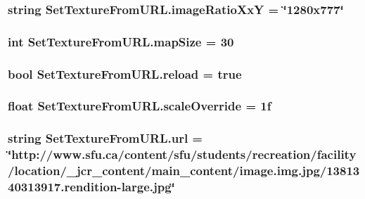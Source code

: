 \subsubsection[{\texorpdfstring{image\+Ratio\+XxY}{imageRatioXxY}}]{\setlength{\rightskip}{0pt plus 5cm}string Set\+Texture\+From\+U\+R\+L.\+image\+Ratio\+XxY = \char`\"{}1280x777\char`\"{}}\hypertarget{class_set_texture_from_u_r_l_a7b760fa9dfbf54476398046cad415789}{}\label{class_set_texture_from_u_r_l_a7b760fa9dfbf54476398046cad415789}
\subsubsection[{\texorpdfstring{map\+Size}{mapSize}}]{\setlength{\rightskip}{0pt plus 5cm}int Set\+Texture\+From\+U\+R\+L.\+map\+Size = 30}\hypertarget{class_set_texture_from_u_r_l_a3bd56e10319aa3c56b4470b956be012d}{}\label{class_set_texture_from_u_r_l_a3bd56e10319aa3c56b4470b956be012d}
\subsubsection[{\texorpdfstring{reload}{reload}}]{\setlength{\rightskip}{0pt plus 5cm}bool Set\+Texture\+From\+U\+R\+L.\+reload = true}\hypertarget{class_set_texture_from_u_r_l_a03dffbbe192d467eb906b41bc58646bf}{}\label{class_set_texture_from_u_r_l_a03dffbbe192d467eb906b41bc58646bf}
\subsubsection[{\texorpdfstring{scale\+Override}{scaleOverride}}]{\setlength{\rightskip}{0pt plus 5cm}float Set\+Texture\+From\+U\+R\+L.\+scale\+Override = 1f}\hypertarget{class_set_texture_from_u_r_l_adf1c2c937c39d649bf47c5bf3fda1556}{}\label{class_set_texture_from_u_r_l_adf1c2c937c39d649bf47c5bf3fda1556}
\subsubsection[{\texorpdfstring{url}{url}}]{\setlength{\rightskip}{0pt plus 5cm}string Set\+Texture\+From\+U\+R\+L.\+url = \char`\"{}http\+://www.\+sfu.\+ca/content/sfu/students/recreation/facility/location/\+\_\+jcr\+\_\+content/main\+\_\+content/image.\+img.\+jpg/1381340313917.rendition-\/large.\+jpg\char`\"{}}\hypertarget{class_set_texture_from_u_r_l_a3f5b914d9d362ac842e704fb35a61d10}{}\label{class_set_texture_from_u_r_l_a3f5b914d9d362ac842e704fb35a61d10}
